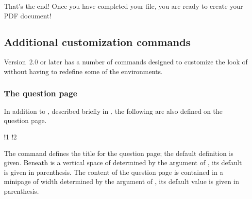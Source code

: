 \documentclass{article}
\begin{document}
That's the end!  Once you have completed your  file, you are
ready to create your  PDF document!


\subsection{Additional customization commands}\label{s:addiCus}

Version~2.0 or later has a number of commands designed to customize the look of  without
having to redefine some of the environments.

\subsubsection{The question page}

In addition to , described briefly in , the following are also defined
on the question page.
\bVerb{}%
\edef\x{\the\wd\webtempboxi}%
\def\1{\hbox to0pt{\hskip\x\relax\quad\normalfont(\texttt{.25in})\hss}}%
\def\2{\hbox to0pt{\hskip\x\relax\quad\normalfont(\texttt{.85\string\linewidth})\hss}}%
%
\begin{dCmd}[commandchars=!()]{\bxSize}
\renewcommand{\ecQUESTION}{\textbf{QUESTION}}
!1
!2
\end{dCmd}
\eVerb The  command defines the title for the question page;
the default definition is given. Beneath  is a vertical space
of  determined by the argument of , its
default is given in parenthesis. The content of the question page is
contained in a minipage of width  determined by the argument of
, its default value is given in parenthesis.
\end{document}
